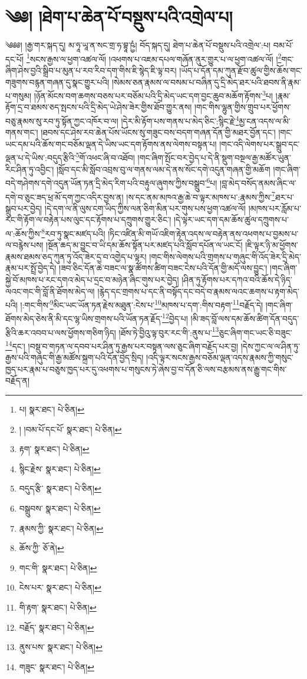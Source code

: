 \setcounter{footnote}{0} 
\chapter{༄༅། །ཐེག་པ་ཆེན་པོ་བསྡུས་པའི་འགྲེལ་པ།}༄༅༅། །རྒྱ་གར་སྐད་དུ། མ་ཧཱ་ཡཱ་ན་སང་གྲ་ཧ་བྷཱ་ཥྱཾ། བོད་སྐད་དུ། ཐེག་པ་ཆེན་པོ་བསྡུས་པའི་འགྲེལ་:པ། བམ་པོ་དང་པོ། \footnote{པ།    སྣར་ཐང་།  པེ་ཅིན། }སངས་རྒྱས་ལ་ཕྱག་འཚལ་ལོ། །འཕགས་པ་འཇམ་དཔལ་གཞོན་ནུར་གྱུར་པ་ལ་ཕྱག་འཚལ་ལོ། །\footnote{། །བམ་པོ་དང་པོ་  སྣར་ཐང་།  པེ་ཅིན། }གང་ཞིག་ཤེས་བྱའི་སྒྲིབ་པ་མུན་པ་རབ་རིབ་དག་གིས་ཇི་སྙེད་ཇི་ལྟ་བར། །ཡོད་པ་དོན་དམ་ཀུན་རྫོབ་ཚུལ་གྱིས་ཆོས་གང་གཟུགས་བརྙན་གཞན་དུ་སྣང་གྱུར་པའི། །སེམས་ཅན་རྣམས་ལ་བསམ་པ་བཞིན་དུ་དྲི་མེད་ཐར་པའི་ཐབས་ནི་རྣམ་པ་གསུམ། །ཉོན་མོངས་བག་ཆགས་བཅས་པར་བཅོམ་པའི་དྲི་མེད་ཡང་དག་བྱང་ཆུབ་མཆོག་རྟོགས་\footnote{རྟག་  སྣར་ཐང་།  པེ་ཅིན། }པ། །རྣམ་རྟོག་དྲ་བ་ཐམས་ཅད་སྤངས་པའི་དྲི་མེད་ཡེ་ཤེས་ཟེར་གྱིས་ཐོབ་གྱུར་ནས། །གང་གིས་ལྷུན་གྱིས་གྲུབ་པར་ཕྱོགས་བཅུ་རྣམས་སུ་རབ་ཏུ་སྟོན་ཀྱང་འཁོར་བ་ལ། །དེར་མི་རྟོག་པས་གནས་པ་མེད་ཅིང་:སྙིང་རྗེ་\footnote{སྙིང་རྗེས་  སྣར་ཐང་།  པེ་ཅིན། }མྱ་ངན་འདས་ལ་མི་གནས་གང་། །ཐབས་དང་ཤེས་རབ་ཆེན་པོས་ཡོངས་སུ་གཟུང་བས་བདག་གཞན་དོན་གྱི་མཐར་བྱོན་དང་། །གང་ཡང་དམ་པའི་ཆོས་གང་བཅོམ་ལྡན་དེ་ཡིས་ཡང་དག་རྟོགས་ནས་ལེགས་བསྟན་པ། །གང་འདི་ལེགས་པར་སྒྲུབ་དང་ལྡན་པ་དེ་ཡིས་:བདུད་རྩིའི་\footnote{བདུད་རྩི་  སྣར་ཐང་།  པེ་ཅིན། }གོ་འཕང་ཞི་བ་འཐོབ། །གང་ཞིག་སྤོང་བར་བྱེད་པ་དེ་ནི་སྡུག་བསྔལ་རྒྱ་མཚོར་ཡུན་རིང་ཤིན་ཏུ་འབྱིང་། །སློབ་དང་མི་སློབ་འབྲས་བུ་ལ་གནས་ལམ་དེ་ནས་སོང་དགེ་འདུན་གཞན་གྱི་མཆོག །གང་ཞིག་བདེ་གཤེགས་དགེ་འདུན་ཡོན་ཏན་དྲི་མེད་རིག་པའི་བརྟུལ་ཞུགས་ཀྱིས་བསྒྲུབ་\footnote{བསྒྲུབས་  སྣར་ཐང་།  པེ་ཅིན། }པ། །བླ་མེད་བསོད་ནམས་ཞིང་ལ་དགེ་བ་ཅུང་ཟད་ཕྲ་མོ་དག་ཀྱང་འདིར་བྱས་ན། །ས་དང་ནམ་མཁའ་རྒྱ་ཆེ་བ་ལྟར་མཁས་པ་:རྣམས་ཀྱིས་\footnote{རྣམས་ཀྱི་  སྣར་ཐང་།  པེ་ཅིན། }ཐར་པ་སྒྲུབ་པར་བྱེད། །དེ་དག་ལ་ནི་ལུས་ངག་ཡིད་ཀྱིས་ལན་ཅིག་མིན་པར་གུས་པས་ཕྱག་འཚལ་ལོ། །མཁས་པར་རློམ་པ་རང་གི་རྟོག་ལ་བརྟེན་པས་ལུང་དང་རྟོགས་པ་དཀྲུགས་གྱུར་ཅིང་། །དེ་ལྟར་ཡང་དག་དམ་ཆོས་ཚུལ་དཀྲུགས་པ་ལ་:ཆོས་ཀྱིས་\footnote{ཆོས་ཀྱི་  ཅོ་ནེ། }རབ་ཏུ་སྣང་མཛད་པའི། །ཏིང་འཛིན་མི་གཡོ་འཇིག་རྟེན་འདས་ལ་བརྟེན་ནས་འཕགས་པ་བྱམས་པ་ལ་བརྙེས་པས། །སྔོན་ཆད་མ་བྱུང་བ་ཡི་དམ་ཆོས་སྟོན་པར་མཛད་པའི་སློབ་དཔོན་ལ་ཡང་ངོ། །ཇི་ལྟར་ཉི་མ་ཕྱོགས་རྣམས་ཐམས་ཅད་ཀུན་ཏུ་འོད་ཟེར་དྲ་བ་འགྱེད་པ་ལྟར། །གང་གིས་ལེགས་པའི་གྲགས་པ་གཞུང་གི་འོད་ཟེར་དྲི་མེད་རྣམ་པར་སྤྲོ་བྱེད་དེ། །ཟབ་ཅིང་དོན་ཆེ་བཟང་ལ་སྣ་ཚོགས་ཚིག་བཟང་ངེས་པའི་དོན་གྱི་མདོ་ལས་བྱུང་། །གང་ཞིག་སྐྱེ་བོ་མཁས་པ་རང་དགའ་མེད་པ་དྲང་བ་མཉེན་ཞིང་གུས་པར་བྱེད། །ཤིན་ཏུ་རྟོགས་པར་དཀའ་བའི་ཆོས་དེ་ཉིད་ལའང་གང་གི་བློ་ནི་ཐོགས་མེད་ལ། །རྙེད་དང་གྲགས་པ་དང་ནི་བསྟོད་དང་བདེ་བ་རྣམས་ལའང་ཆགས་པ་རྟག་མེད་པའི། །:གང་གིས་\footnote{གང་གི་  སྣར་ཐང་།  པེ་ཅིན། }མིང་ཡང་ཡོན་ཏན་རྗེས་མཐུན་:ངེས་པ་\footnote{ངེས་པར་  སྣར་ཐང་།  པེ་ཅིན། }མཁས་པ་དག་:གིས་བརྟག་\footnote{གི་རྟག་  སྣར་ཐང་།  པེ་ཅིན། }བརྗོད་དེ། །གང་ཞིག་ཐོགས་མེད་ཅེས་ནི་མི་དང་ལྷ་ཡིས་གྲགས་པའི་ཡོན་ཏན་རྗོད་\footnote{བརྗོད་  སྣར་ཐང་།  པེ་ཅིན། }བྱེད་པ། །མི་ཟད་བློ་ལས་དམ་ཆོས་ཚིག་དོན་བདུད་རྩིའི་ཆར་འབབ་པ་ལས་ཕྱོགས་གཅིག་ཉིད། །ཐོས་ཏེ་བྱིའུ་ལྟ་བུར་རང་གི་:ནུས་པ་\footnote{ནུས་པས་  སྣར་ཐང་།  པེ་ཅིན། }ཅུང་ཞིག་གང་ཡང་ཅི་བཟུང་\footnote{གཟུང་  སྣར་ཐང་།  པེ་ཅིན། }དང་། །བསྡུ་བ་གཏན་ལ་དབབ་པར་ཤིན་ཏུ་རྒྱས་པར་བསྟན་ལས་ཅུང་ཞིག་བརྗོད་པར་བྱ། །དེས་ཀྱང་ལ་ལ་ཤིན་ཏུ་རྒྱས་པའི་གཞུང་གི་རྒྱ་མཚོས་སྐྲག་པའི་དོན་བྱེད་སྲིད། །འདི་ལྟར་སངས་རྒྱས་བཅོམ་ལྡན་འདས་རྣམས་ཀྱི་གསུང་ཁྱད་པར་རྣམ་པ་བཅུས་ཁྱད་པར་དུ་འཕགས་པ་གསུངས་ཏེ་ཞེས་བྱ་བ་དོན་ཅི་ལས་བརྩམས་ནས་རྒྱུ་གང་གིས་བརྗོད་ན། 